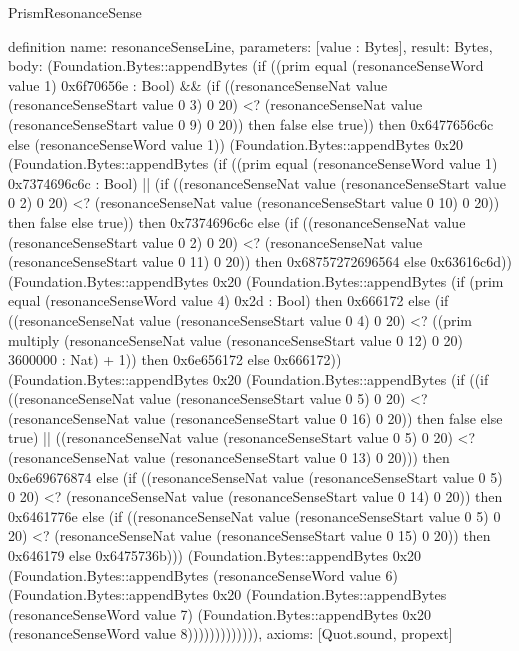 \begin{lexlean}{PrismResonanceSense}
\begin{semanticmodule}
definition{
  name: resonanceSenseLine,
  parameters: [value : Bytes],
  result: Bytes,
  body: (Foundation.Bytes::appendBytes (if ((prim equal (resonanceSenseWord value 1) 0x6f70656e : Bool) && (if ((resonanceSenseNat value (resonanceSenseStart value 0 3) 0 20) <? (resonanceSenseNat value (resonanceSenseStart value 0 9) 0 20)) then false else true)) then 0x6477656c6c else (resonanceSenseWord value 1)) (Foundation.Bytes::appendBytes 0x20 (Foundation.Bytes::appendBytes (if ((prim equal (resonanceSenseWord value 1) 0x7374696c6c : Bool) || (if ((resonanceSenseNat value (resonanceSenseStart value 0 2) 0 20) <? (resonanceSenseNat value (resonanceSenseStart value 0 10) 0 20)) then false else true)) then 0x7374696c6c else (if ((resonanceSenseNat value (resonanceSenseStart value 0 2) 0 20) <? (resonanceSenseNat value (resonanceSenseStart value 0 11) 0 20)) then 0x68757272696564 else 0x63616c6d)) (Foundation.Bytes::appendBytes 0x20 (Foundation.Bytes::appendBytes (if (prim equal (resonanceSenseWord value 4) 0x2d : Bool) then 0x666172 else (if ((resonanceSenseNat value (resonanceSenseStart value 0 4) 0 20) <? ((prim multiply (resonanceSenseNat value (resonanceSenseStart value 0 12) 0 20) 3600000 : Nat) + 1)) then 0x6e656172 else 0x666172)) (Foundation.Bytes::appendBytes 0x20 (Foundation.Bytes::appendBytes (if ((if ((resonanceSenseNat value (resonanceSenseStart value 0 5) 0 20) <? (resonanceSenseNat value (resonanceSenseStart value 0 16) 0 20)) then false else true) || ((resonanceSenseNat value (resonanceSenseStart value 0 5) 0 20) <? (resonanceSenseNat value (resonanceSenseStart value 0 13) 0 20))) then 0x6e69676874 else (if ((resonanceSenseNat value (resonanceSenseStart value 0 5) 0 20) <? (resonanceSenseNat value (resonanceSenseStart value 0 14) 0 20)) then 0x6461776e else (if ((resonanceSenseNat value (resonanceSenseStart value 0 5) 0 20) <? (resonanceSenseNat value (resonanceSenseStart value 0 15) 0 20)) then 0x646179 else 0x6475736b))) (Foundation.Bytes::appendBytes 0x20 (Foundation.Bytes::appendBytes (resonanceSenseWord value 6) (Foundation.Bytes::appendBytes 0x20 (Foundation.Bytes::appendBytes (resonanceSenseWord value 7) (Foundation.Bytes::appendBytes 0x20 (resonanceSenseWord value 8))))))))))))),
  axioms: [Quot.sound, propext]
}


\end{semanticmodule}
\end{lexlean}
